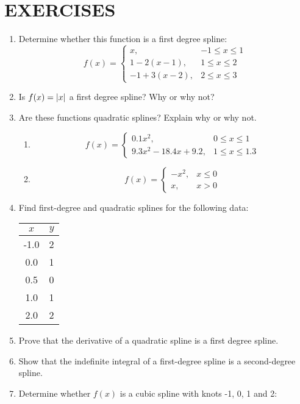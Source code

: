 \documentclass[12pt,class=book,crop=false]{standalone}
\begin{document}
\section{EXERCISES}
\begin{enumerate}
	\item Determine whether this function is a first degree spline:
	\[
		f(x)=\begin{cases}
			x,& -1 \leq x \leq 1\\
			1-2(x-1),& 1 \leq x \leq 2\\
			-1+3(x-2), &2 \leq x \leq 3
		\end{cases}
	\]
	\item Is $ f(x)=\left\vert x\right\vert $ a first degree spline? Why or why not?
	\item Are these functions quadratic splines? Explain why or why not.
	\begin{enumerate}
		\item \[
			f(x)=\begin{cases}
				0.1x^2, &0 \leq x \leq 1\\
				9.3x^2-18.4x+9.2,& 1 \leq x \leq 1.3
			\end{cases}
		\]
		\item \[
			f(x)=\begin{cases}
				-x^2, &x \leq 0\\
				x , &x>0
			\end{cases}
		\]
	\end{enumerate}
	\item Find first-degree and quadratic splines for the following data:
	\begin{table}[H]
		\centering
		\begin{tabular}{S[table-format=1.1]c}
			\toprule
				&
			$ y $	\\	&
			2	\\
			0.0	&
			1	\\
			0.5	&
			0	\\
			1.0	&
			1	\\
			2.0&
			2\\\bottomrule
		\end{tabular}
	\end{table}
	\item Prove that the derivative of a quadratic spline is a first degree spline.
	\item Show that the indefinite integral of a first-degree spline is a second-degree spline.
	\item Determine whether $ f(x) $ is a cubic spline with knots -1, 0, 1 and 2:

\end{enumerate}
\end{document}
